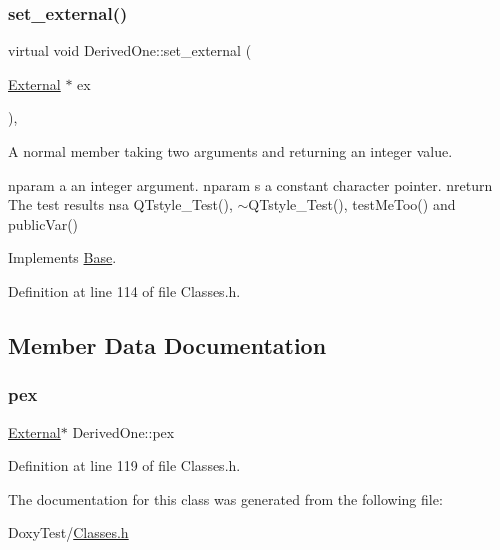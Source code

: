 \subsubsection{\texorpdfstring{set\+\_\+external()}{set\_external()}}
{\footnotesize\ttfamily virtual void Derived\+One\+::set\+\_\+external (\begin{DoxyParamCaption}\item[{\hyperlink{class_external}{External} $\ast$}]{ex }\end{DoxyParamCaption})\hspace{0.3cm}{\ttfamily [inline]}, {\ttfamily [virtual]}}



A normal member taking two arguments and returning an integer value. 

nparam a an integer argument. nparam s a constant character pointer. nreturn The test results nsa Q\+Tstyle\+\_\+\+Test(), $\sim$\+Q\+Tstyle\+\_\+\+Test(), test\+Me\+Too() and public\+Var() 

Implements \hyperlink{class_base_a87ec2d3dcffa1d22d4fe4f651f625d49}{Base}.



Definition at line 114 of file Classes.\+h.



\subsection{Member Data Documentation}
\mbox{\label{class_derived_one_aa55e1fcdabd28d0520ec6e68d530cc77}} 
\subsubsection{\texorpdfstring{pex}{pex}}
{\footnotesize\ttfamily \hyperlink{class_external}{External}$\ast$ Derived\+One\+::pex}



Definition at line 119 of file Classes.\+h.



The documentation for this class was generated from the following file\+:\begin{DoxyCompactItemize}
\item 
Doxy\+Test/\hyperlink{_classes_8h}{Classes.\+h}\end{DoxyCompactItemize}
